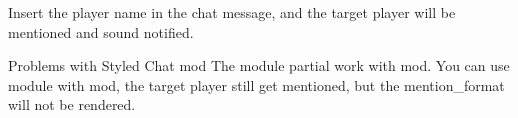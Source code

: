 Insert the player name in the chat message, and the target player will be mentioned and sound notified.

\begin{note}{Problems with Styled Chat mod}
    The  module partial work with  mod.
    You can use  module with  mod, the target player still get mentioned, but the mention\_format will not be rendered.
\end{note}

